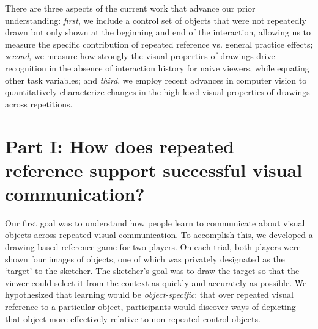 \documentclass[10pt,letterpaper]{article}
\begin{document}

There are three aspects of the current work that advance our prior understanding: \emph{first}, we include a control set of objects that were not repeatedly drawn but only shown at the beginning and end of the interaction, allowing us to measure the specific contribution of repeated reference vs. general practice effects; \emph{second}, we measure how strongly the visual properties of drawings drive recognition in the absence of interaction history for naive viewers, while equating other task variables; and \emph{third}, we employ recent advances in computer vision to quantitatively characterize changes in the high-level visual properties of drawings across repetitions.



\section{Part I: How does repeated reference support successful visual communication?}

Our first goal was to understand how people learn to communicate about visual objects across repeated visual communication.
To accomplish this, we developed a drawing-based reference game for two players.
On each trial, both players were shown four images of objects, one of which was privately designated as the `target' to the sketcher.
The sketcher's goal was to draw the target so that the viewer could select it from the context as quickly and accurately as possible.
We hypothesized that learning would be \emph{object-specific}: that over repeated visual reference to a particular object, participants would discover ways of depicting that object more effectively relative to non-repeated control objects.


\end{document}
